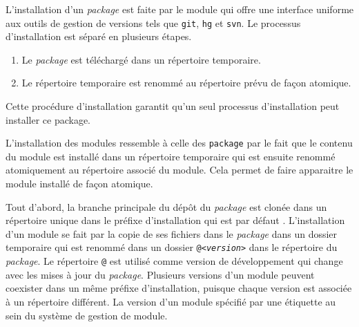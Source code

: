 L'installation d'un \textit{package} est faite par le module  qui
offre une interface uniforme aux outils de gestion de versions tels que
\texttt{git}, \texttt{hg} et \texttt{svn}.  Le processus d'installation est
séparé en plusieurs étapes.
\begin{enumerate}
  \item Le \textit{package} est téléchargé dans un répertoire temporaire.
  \item Le répertoire temporaire est renommé au répertoire prévu de façon atomique.
\end{enumerate}
Cette procédure d'installation garantit qu'un seul processus d'installation peut
installer ce package.

L'installation des modules ressemble à celle des \texttt{package} par le fait
que le contenu du module est installé dans un répertoire temporaire qui est
ensuite renommé atomiquement au répertoire associé du module.  Cela permet de
faire apparaitre le module installé de façon atomique.

Tout d'abord, la branche principale du dépôt du \textit{package} est clonée
dans un répertoire unique dans le préfixe d'installation qui est par défaut
. L'installation d'un module se fait par la copie de ses
fichiers dans le \textit{package} dans un dossier temporaire qui est renommé
dans un dossier \texttt{@\textit{<version>}} dans le répertoire du
\textit{package}. Le répertoire {\tt @} est utilisé comme version de
développement qui change avec les mises à jour du \textit{package}.  Plusieurs
versions d'un module peuvent coexister dans un même préfixe d'installation,
puisque chaque version est associée à un répertoire différent.  La version d'un
module spécifié par une étiquette au sein du système de gestion de module.



